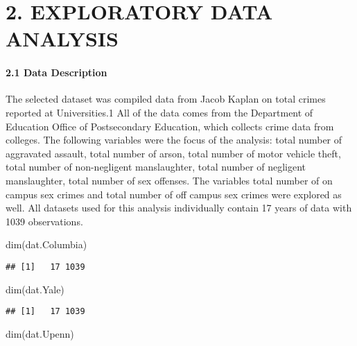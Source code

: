 \documentclass[
]{article}
\newenvironment{Shaded}{\begin{snugshade}}{\end{snugshade}}
\newcommand{\FunctionTok}[1]{\textcolor[rgb]{0.00,0.00,0.00}{#1}}
\newcommand{\NormalTok}[1]{#1}
\begin{document}
\hypertarget{exploratory-data-analysis}{%
\section{2. EXPLORATORY DATA ANALYSIS}\label{exploratory-data-analysis}}

\hypertarget{data-description}{%
\paragraph{2.1 Data Description}\label{data-description}}

The selected dataset was compiled data from Jacob Kaplan on total crimes
reported at Universities.1 All of the data comes from the Department of
Education Office of Postsecondary Education, which collects crime data
from colleges. The following variables were the focus of the analysis:
total number of aggravated assault, total number of arson, total number
of motor vehicle theft, total number of non-negligent manslaughter,
total number of negligent manslaughter, total number of sex offenses.
The variables total number of on campus sex crimes and total number of
off campus sex crimes were explored as well. All datasets used for this
analysis individually contain 17 years of data with 1039 observations.

\begin{Shaded}
\begin{Highlighting}[]
\FunctionTok{dim}\NormalTok{(dat.Columbia)}
\end{Highlighting}
\end{Shaded}

\begin{verbatim}
## [1]   17 1039
\end{verbatim}

\begin{Shaded}
\begin{Highlighting}[]
\FunctionTok{dim}\NormalTok{(dat.Yale)}
\end{Highlighting}
\end{Shaded}

\begin{verbatim}
## [1]   17 1039
\end{verbatim}

\begin{Shaded}
\begin{Highlighting}[]
\FunctionTok{dim}\NormalTok{(dat.Upenn)}
\end{Highlighting}
\end{Shaded}
\end{document}
